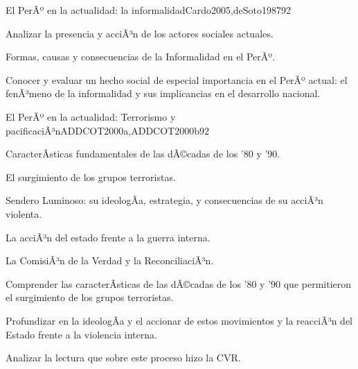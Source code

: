 \begin{syllabus}
\begin{unit}{El PerÃº en la actualidad: la informalidad}{Cardo2005,deSoto1987}{9}{2}
\begin{topics}
      \item Analizar la presencia y acciÃ³n de los actores sociales actuales.
      \item Formas, causas y consecuencias de la Informalidad en el PerÃº.
\end{topics}

\begin{unitgoals}
      \item Conocer y evaluar un hecho social de especial importancia en el PerÃº actual: el fenÃ³meno de la informalidad y sus implicancias en el desarrollo nacional.
\end{unitgoals}
\end{unit}

\begin{unit}{El PerÃº en la actualidad: Terrorismo y pacificaciÃ³n}{ADDCOT2000a,ADDCOT2000b}{9}{2}
\begin{topics}
      \item CaracterÃ­sticas fundamentales de las dÃ©cadas de los '80 y '90.
      \item El surgimiento de los grupos terroristas.
      \item Sendero Luminoso: su ideologÃ­a, estrategia, y consecuencias de su acciÃ³n violenta.
      \item La acciÃ³n del estado frente a la guerra interna.
      \item La ComisiÃ³n de la Verdad y la ReconciliaciÃ³n.
\end{topics}
\begin{unitgoals}
      \item Comprender las caracterÃ­sticas de las dÃ©cadas de los '80 y '90 que permitieron el surgimiento de los grupos terroristas.
      \item Profundizar en la ideologÃ­a y el accionar de estos movimientos y la reacciÃ³n del Estado frente a la violencia interna.
      \item Analizar la lectura que sobre este proceso hizo la CVR.
\end{unitgoals}
\end{unit}

\begin{coursebibliography}
\end{coursebibliography}

\end{syllabus}

%
